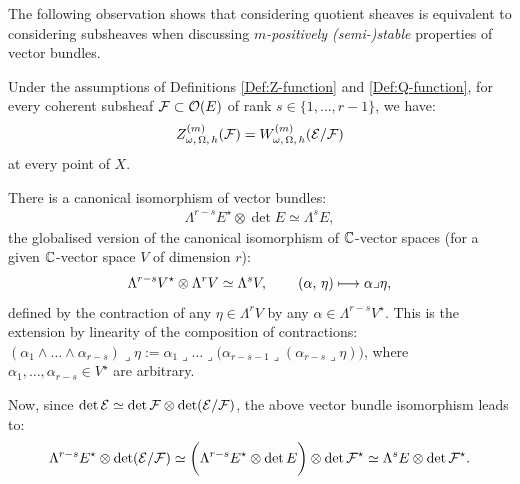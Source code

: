 \documentclass[12pt]{article}
\begin{document}
  The following observation shows that considering quotient sheaves is equivalent to considering subsheaves when discussing {\it $m$-positively (semi-)stable} properties of vector bundles.

\begin{Prop}\label{Prop:subsheaves_quotient-sheaves_equiv} Under the assumptions of Definitions \ref{Def:Z-function} and \ref{Def:Q-function}, for every coherent subsheaf ${\cal F}\subset{\cal O}(E)$ of rank $s\in\{1,\dots , r-1\}$, we have: \begin{eqnarray*}Z_{\omega,\,\Omega,\,h}^{(m)}({\cal F}) = W_{\omega,\,\Omega,\,h}^{(m)}({\cal E}/{\cal F})\end{eqnarray*} at every point of $X$. 



\end{Prop}

 There is a canonical isomorphism of vector bundles: \begin{eqnarray*}\Lambda^{r-s}E^\star\otimes\det E\simeq\Lambda^sE,\end{eqnarray*} the globalised version of the canonical isomorphism of $\mathbb{C}$-vector spaces (for a given $\mathbb{C}$-vector space $V$ of dimension $r$): \begin{eqnarray*}\Lambda^{r-s}V^\star\otimes\Lambda^r V\simeq\Lambda^sV,  \hspace{5ex} (\alpha,\,\eta)\longmapsto\alpha\lrcorner\eta,\end{eqnarray*} defined by the contraction of any $\eta\in\Lambda^r V$ by any $\alpha\in\Lambda^{r-s}V^\star$. This is the extension by linearity of the composition of contractions: $(\alpha_1\wedge\dots\wedge\alpha_{r-s})\lrcorner\eta := \alpha_1\lrcorner\dots\lrcorner\bigg(\alpha_{r-s-1}\lrcorner(\alpha_{r-s}\lrcorner\eta)\bigg)$, where $\alpha_1,\dots ,\alpha_{r-s}\in V^\star$ are arbitrary.

Now, since $\det{\cal E}\simeq\det{\cal F}\otimes\det({\cal E}/{\cal F})$, the above vector bundle isomorphism leads to: \begin{eqnarray*}\Lambda^{r-s} E^\star\otimes\det({\cal E}/{\cal F})\simeq\bigg(\Lambda^{r-s}E^\star\otimes\det E\bigg)\otimes\det {\cal F}^\star\simeq\Lambda^sE\otimes\det {\cal F}^\star.\end{eqnarray*}
\end{document}
